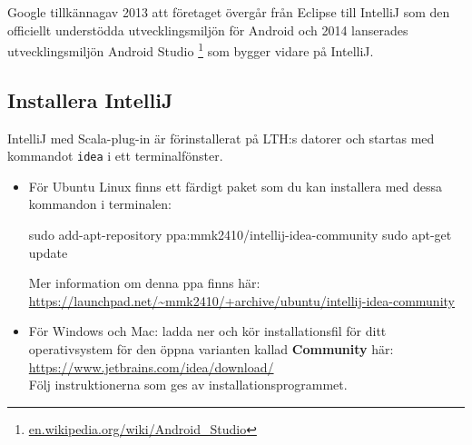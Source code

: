 Google tillkännagav 2013 att företaget övergår från Eclipse till IntelliJ som den officiellt understödda utvecklingsmiljön för Android och 2014 lanserades utvecklingsmiljön Android Studio%
\footnote {\href{https://en.wikipedia.org/wiki/Android_Studio}{en.wikipedia.org/wiki/Android\_Studio}}
 som bygger vidare på IntelliJ.

\subsection{Installera IntelliJ}\label{appendix:ide:intellij:install}

IntelliJ med Scala-plug-in är förinstallerat på LTH:s datorer och startas med kommandot \texttt{idea} i ett terminalfönster.

\begin{itemize}
\item För Ubuntu Linux finns ett färdigt paket som du kan installera med dessa kommandon i terminalen:
\begin{REPLnonum}
sudo add-apt-repository ppa:mmk2410/intellij-idea-community
sudo apt-get update
\end{REPLnonum}
Mer information om denna ppa finns här:\\ \url{https://launchpad.net/~mmk2410/+archive/ubuntu/intellij-idea-community}\item För Windows och Mac: ladda ner och kör installationsfil för ditt operativsystem för den öppna varianten kallad \textbf{Community} här: \\
\url{https://www.jetbrains.com/idea/download/} \\
Följ instruktionerna som ges av installationsprogrammet.
\end{itemize}

